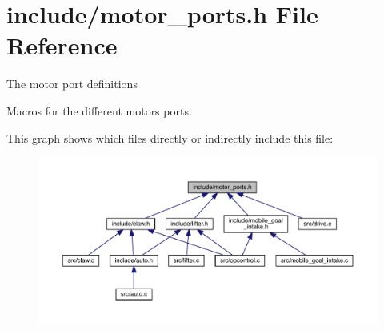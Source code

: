 \section{include/motor\+\_\+ports.h File Reference}
\label{motor__ports_8h}


The motor port definitions

Macros for the different motors ports.  


This graph shows which files directly or indirectly include this file\+:\nopagebreak
\begin{figure}[H]
\begin{center}
\leavevmode
\includegraphics[width=350pt]{motor__ports_8h__dep__incl}
\end{center}
\end{figure}
